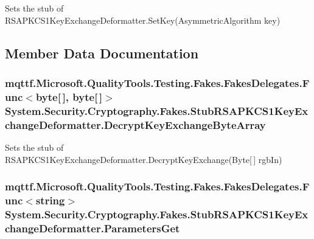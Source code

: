 Sets the stub of R\-S\-A\-P\-K\-C\-S1\-Key\-Exchange\-Deformatter.\-Set\-Key(\-Asymmetric\-Algorithm key)



\subsection{Member Data Documentation}
\hypertarget{class_system_1_1_security_1_1_cryptography_1_1_fakes_1_1_stub_r_s_a_p_k_c_s1_key_exchange_deformatter_ad2425a4b2fac6c6d558abbca82806171}{
\subsubsection[{Decrypt\-Key\-Exchange\-Byte\-Array}]{\setlength{\rightskip}{0pt plus 5cm}mqttf.\-Microsoft.\-Quality\-Tools.\-Testing.\-Fakes.\-Fakes\-Delegates.\-Func$<$byte\mbox{[}$\,$\mbox{]}, byte\mbox{[}$\,$\mbox{]}$>$ System.\-Security.\-Cryptography.\-Fakes.\-Stub\-R\-S\-A\-P\-K\-C\-S1\-Key\-Exchange\-Deformatter.\-Decrypt\-Key\-Exchange\-Byte\-Array}}\label{class_system_1_1_security_1_1_cryptography_1_1_fakes_1_1_stub_r_s_a_p_k_c_s1_key_exchange_deformatter_ad2425a4b2fac6c6d558abbca82806171}


Sets the stub of R\-S\-A\-P\-K\-C\-S1\-Key\-Exchange\-Deformatter.\-Decrypt\-Key\-Exchange(\-Byte\mbox{[}$\,$\mbox{]} rgb\-In)

\hypertarget{class_system_1_1_security_1_1_cryptography_1_1_fakes_1_1_stub_r_s_a_p_k_c_s1_key_exchange_deformatter_a96a1db2d38059f466a4d8e49efa3334b}{
\subsubsection[{Parameters\-Get}]{\setlength{\rightskip}{0pt plus 5cm}mqttf.\-Microsoft.\-Quality\-Tools.\-Testing.\-Fakes.\-Fakes\-Delegates.\-Func$<$string$>$ System.\-Security.\-Cryptography.\-Fakes.\-Stub\-R\-S\-A\-P\-K\-C\-S1\-Key\-Exchange\-Deformatter.\-Parameters\-Get}}\label{class_system_1_1_security_1_1_cryptography_1_1_fakes_1_1_stub_r_s_a_p_k_c_s1_key_exchange_deformatter_a96a1db2d38059f466a4d8e49efa3334b}


